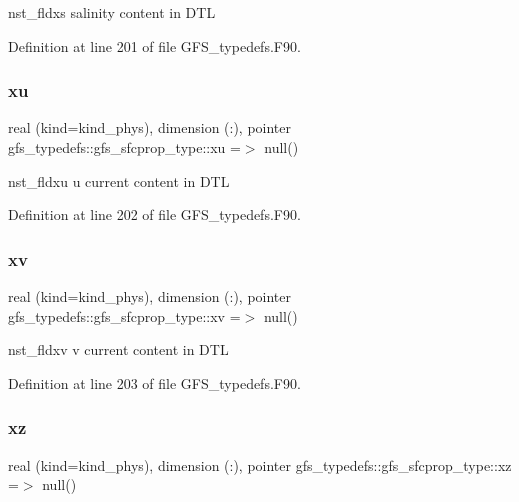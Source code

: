 nst\+\_\+fldxs salinity content in D\+TL 



Definition at line 201 of file G\+F\+S\+\_\+typedefs.\+F90.

\mbox{\label{structgfs__typedefs_1_1gfs__sfcprop__type_aebe3a691282a7231d958f8b407d673b2}} 
\subsubsection{xu}
{\footnotesize\ttfamily real (kind=kind\+\_\+phys), dimension     (\+:), pointer gfs\+\_\+typedefs\+::gfs\+\_\+sfcprop\+\_\+type\+::xu =$>$ null()}



nst\+\_\+fldxu u current content in D\+TL 



Definition at line 202 of file G\+F\+S\+\_\+typedefs.\+F90.

\mbox{\label{structgfs__typedefs_1_1gfs__sfcprop__type_ae70dfd74290071bb5022dfda7abb41b6}} 
\subsubsection{xv}
{\footnotesize\ttfamily real (kind=kind\+\_\+phys), dimension     (\+:), pointer gfs\+\_\+typedefs\+::gfs\+\_\+sfcprop\+\_\+type\+::xv =$>$ null()}



nst\+\_\+fldxv v current content in D\+TL 



Definition at line 203 of file G\+F\+S\+\_\+typedefs.\+F90.

\mbox{\label{structgfs__typedefs_1_1gfs__sfcprop__type_aeb8deec2fe8d343e8c7ebbefbafaf34d}} 
\subsubsection{xz}
{\footnotesize\ttfamily real (kind=kind\+\_\+phys), dimension     (\+:), pointer gfs\+\_\+typedefs\+::gfs\+\_\+sfcprop\+\_\+type\+::xz =$>$ null()}



